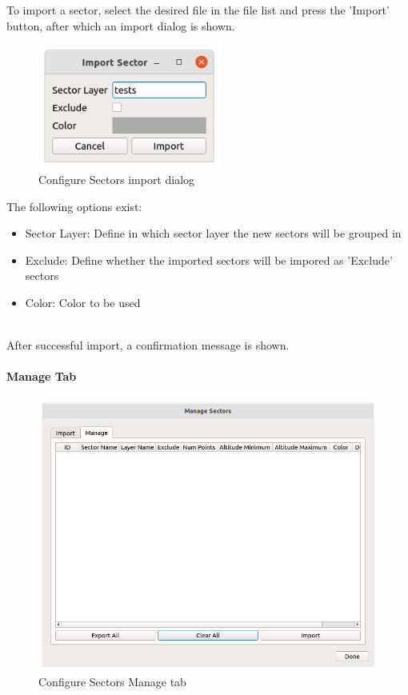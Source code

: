 To import a sector, select the desired file in the file list and press the 'Import' button, after which an import dialog is shown. \\

\begin{figure}[H]
    \includegraphics[width=6cm]{figures/configure_sectors_import_dialog.png}
  \caption{Configure Sectors import dialog}
\end{figure}

The following options exist:
\begin{itemize}
\item Sector Layer: Define in which sector layer the new sectors will be grouped in
\item Exclude: Define whether the imported sectors will be impored as 'Exclude' sectors
\item Color: Color to be used
\end{itemize}
\ \\

After successful import, a confirmation message is shown. \\

\paragraph {Manage Tab}
\label{sec:ui_configure_sectors_manage}

\begin{figure}[H]
    \includegraphics[width=15cm]{figures/configure_sectors_manage.png}
  \caption{Configure Sectors Manage tab}
\end{figure}

